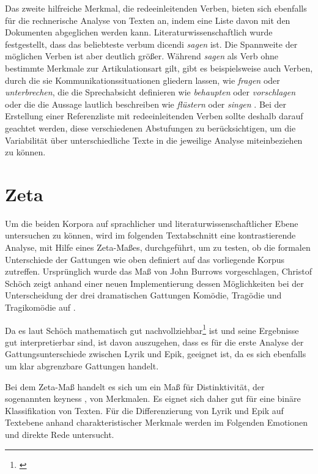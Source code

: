 \documentclass[a4paper,10p]{article}
\begin{document}
Das zweite hilfreiche Merkmal, die redeeinleitenden Verben, bieten sich ebenfalls für die rechnerische Analyse von Texten an, indem eine Liste davon mit den Dokumenten abgeglichen werden kann. Literaturwissenschaftlich wurde festgestellt, dass das beliebteste verbum dicendi \textit{sagen} ist. Die Spannweite der möglichen Verben ist aber deutlich größer. Während \textit{sagen} als Verb ohne bestimmte Merkmale zur Artikulationsart gilt, gibt es beispielsweise auch Verben, durch die sie Kommunikationssituationen gliedern lassen, wie \textit{fragen} oder \textit{unterbrechen}, die die Sprechabsicht definieren wie \textit{behaupten} oder \textit{vorschlagen} oder die die Aussage lautlich beschreiben wie \textit{flüstern} oder \textit{singen} \citep[vgl.][S. 66-68]{Blossg2005}. Bei der Erstellung einer Referenzliste mit redeeinleitenden Verben sollte deshalb darauf geachtet werden, diese verschiedenen Abstufungen zu berücksichtigen, um die Variabilität über unterschiedliche Texte in die jeweilige Analyse miteinbeziehen zu können.


\section{Zeta}
Um die beiden Korpora auf sprachlicher und literaturwissenschaftlicher Ebene untersuchen zu können, wird im folgenden Textabschnitt eine kontrastierende Analyse, mit Hilfe eines Zeta-Maßes, durchgeführt, um zu testen, ob die formalen Unterschiede der Gattungen wie oben definiert auf das vorliegende Korpus zutreffen. Ursprünglich wurde das Maß von John Burrows vorgeschlagen, Christof Schöch zeigt anhand einer neuen Implementierung dessen Möglichkeiten bei der Unterscheidung der drei dramatischen Gattungen Komödie, Tragödie und Tragikomödie auf \citep[vgl.][S. 77 f.]{SchoechZeta}. \par 

Da es laut  Schöch \glqq mathematisch gut nachvollziehbar\grqq \footnote{\citep[S. 78]{SchoechZeta}} ist und seine Ergebnisse gut interpretierbar sind, ist davon auszugehen, dass es für die erste Analyse der Gattungsunterschiede zwischen Lyrik und Epik, geeignet ist, da es sich ebenfalls um klar abgrenzbare Gattungen handelt.\par 

Bei dem Zeta-Maß handelt es sich um ein Maß für Distinktivität, der sogenannten \glq keyness \grq, von Merkmalen. Es eignet sich daher gut für eine binäre Klassifikation von Texten. Für die Differenzierung von Lyrik und Epik auf Textebene anhand charakteristischer Merkmale werden im Folgenden Emotionen und direkte Rede untersucht. \par 
\end{document}
